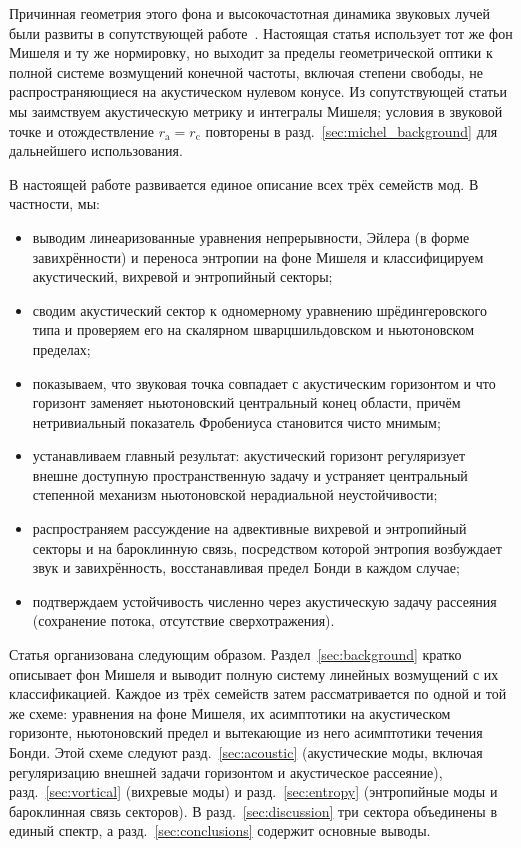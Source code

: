 \documentclass[12pt,a4paper,preprint,nopreprintline]{elsarticle}
\begin{document}
Причинная геометрия этого фона и высокочастотная динамика звуковых лучей были развиты в сопутствующей работе~\cite{SemyannikovAV_AcousticGeometryAndSoundRayDynamics_2026}. Настоящая статья использует тот же фон Мишеля и ту же нормировку, но выходит за пределы геометрической оптики к полной системе возмущений конечной частоты, включая степени свободы, не распространяющиеся на акустическом нулевом конусе. Из сопутствующей статьи мы заимствуем акустическую метрику и интегралы Мишеля; условия в звуковой точке и отождествление $r_{\mathrm{a}}=r_{\mathrm{c}}$ повторены в разд.~\ref{sec:michel_background} для дальнейшего использования.

В настоящей работе развивается единое описание всех трёх семейств мод. В частности, мы:
\begin{itemize}
    \item выводим линеаризованные уравнения непрерывности, Эйлера (в форме завихрённости) и переноса энтропии на фоне Мишеля и классифицируем акустический, вихревой и энтропийный секторы;
    \item сводим акустический сектор к одномерному уравнению шрёдингеровского типа и проверяем его на скалярном шварцшильдовском и ньютоновском пределах;
    \item показываем, что звуковая точка совпадает с акустическим горизонтом и что горизонт заменяет ньютоновский центральный конец области, причём нетривиальный показатель Фробениуса становится чисто мнимым;
    \item устанавливаем главный результат: акустический горизонт регуляризует внешне доступную пространственную задачу и устраняет центральный степенной механизм ньютоновской нерадиальной неустойчивости;
    \item распространяем рассуждение на адвективные вихревой и энтропийный секторы и на бароклинную связь, посредством которой энтропия возбуждает звук и завихрённость, восстанавливая предел Бонди в каждом случае;
    \item подтверждаем устойчивость численно через акустическую задачу рассеяния (сохранение потока, отсутствие сверхотражения).
\end{itemize}

Статья организована следующим образом. Раздел~\ref{sec:background} кратко описывает фон Мишеля и выводит полную систему линейных возмущений с их классификацией. Каждое из трёх семейств затем рассматривается по одной и той же схеме: уравнения на фоне Мишеля, их асимптотики на акустическом горизонте, ньютоновский предел и вытекающие из него асимптотики течения Бонди. Этой схеме следуют разд.~\ref{sec:acoustic} (акустические моды, включая регуляризацию внешней задачи горизонтом и акустическое рассеяние), разд.~\ref{sec:vortical} (вихревые моды) и разд.~\ref{sec:entropy} (энтропийные моды и бароклинная связь секторов). В разд.~\ref{sec:discussion} три сектора объединены в единый спектр, а разд.~\ref{sec:conclusions} содержит основные выводы.
\end{document}
